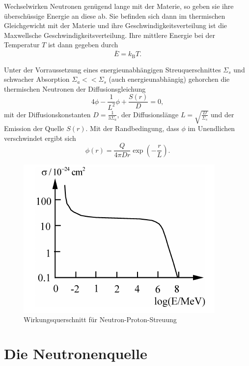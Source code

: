 Wechselwirken Neutronen genügend lange mit der Materie, so geben sie ihre überschüssige Energie an diese ab. Sie befinden sich dann im thermischen Gleichgewicht mit der Materie und ihre Geschwindigkeitsverteilung ist die Maxwellsche Geschwindigkeitsverteilung.
Ihre mittlere Energie bei der Temperatur $T$ ist dann gegeben durch
\begin{equation}
 \overline{E} = k_{\textrm{B}}T.
\end{equation}

Unter der Vorraussetzung eines energieunabhängigen Streuquerschnittes $\Sigma_{s}$ und schwacher Absorption $\Sigma_{a}<<\Sigma_{s}$ (auch energieunabhängig) gehorchen die thermischen Neutronen der Diffusionsgleichung
\begin{equation}
 \mathcal{4} \phi - \frac{1}{L^{2}}\phi + \frac{S(r)}{D} = 0,
\end{equation}
mit der Diffusionskonstanten $D=\frac{1}{3\Sigma_{a}}$, der Diffusionslänge $L=\sqrt{\frac{D}{\Sigma_{s}}}$ und der Emission der Quelle $S(r)$. Mit der Randbedingung, dass $\phi$ im Unendlichen verschwindet ergibt sich
\begin{equation}
 \phi(r) = \frac{Q}{4\pi D r}\exp\left( -\frac{r}{L}\right).
\end{equation}

\begin{figure}[tb]
  \centering
  \includegraphics[scale=1.0]{./fig/np_streuung.png}
  \caption{Wirkungsquerschnitt für Neutron-Proton-Streuung \cite{BB}}
  \label{fig:np}
\end{figure}

\section{Die Neutronenquelle}

